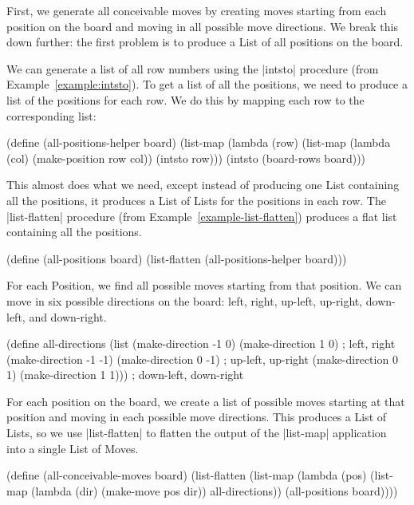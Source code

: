 \begin{schemeregion}
{First, we generate all conceivable moves by creating moves starting from each position on the board and moving in all possible move directions.  We break this down further: the first problem is to produce a List of all positions on the board.  

We can generate a list of all row numbers using the \scheme|intsto| procedure (from Example~\ref{example:intsto}).  To get a list of all the positions, we need to produce a list of the positions for each row.  We do this by mapping each row to the corresponding list:
\begin{schemedisplay}
(define (all-positions-helper board)
  (list-map 
    (lambda (row) (list-map (lambda (col) (make-position row col))
                            (intsto row)))
    (intsto (board-rows board)))
\end{schemedisplay}
This almost does what we need, except instead of producing one List containing all the positions, it produces a List of Lists for the positions in each row.  The \scheme|list-flatten| procedure (from Example~\ref{example-list-flatten}) produces a flat list containing all the positions.
\begin{schemedisplay}          
(define (all-positions board)
  (list-flatten (all-positions-helper board)))
\end{schemedisplay}

For each Position, we find all possible moves starting from that position.  We can move in six possible directions on the board: left, right, up-left, up-right, down-left, and down-right.
\begin{schemedisplay}
(define all-directions
  (list 
   (make-direction -1 0) (make-direction 1 0) ; left, right
   (make-direction -1 -1) (make-direction 0 -1) ; up-left, up-right
   (make-direction 0 1) (make-direction 1 1))) ; down-left, down-right
\end{schemedisplay}

For each position on the board, we create a list of possible moves starting at that position and moving in each possible move directions.  This produces a List of Lists, so we use \scheme|list-flatten| to flatten the output of the \scheme|list-map| application into a single List of Moves.

\begin{schemedisplay}
(define (all-conceivable-moves board)
  (list-flatten
    (list-map
      (lambda (pos) (list-map (lambda (dir) (make-move pos dir))
                              all-directions))
      (all-positions board))))
\end{schemedisplay}

}
\end{schemeregion}
